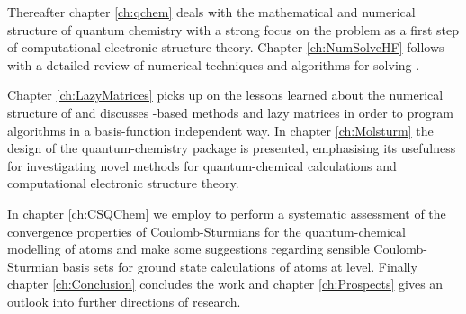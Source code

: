 Thereafter chapter \ref{ch:qchem}
deals with the mathematical and numerical structure of quantum chemistry
with a strong focus on the \HF problem
as a first step of computational electronic structure theory.
Chapter \ref{ch:NumSolveHF}
follows with a detailed review of numerical techniques and \SCF algorithms
for solving \HF.

Chapter \ref{ch:LazyMatrices}
picks up on the lessons learned about the numerical structure
of \HF and discusses
\contraction-based methods and lazy matrices
in order to program algorithms
in a basis-function independent way.
In chapter \ref{ch:Molsturm} the design of the quantum-chemistry
package \molsturm is presented,
emphasising its usefulness for investigating novel methods
for quantum-chemical calculations
and computational electronic structure theory.

In chapter \ref{ch:CSQChem} we employ \molsturm
to perform a systematic assessment of
the convergence properties of Coulomb-Sturmians
for the quantum-chemical modelling of atoms
and make some suggestions regarding
sensible Coulomb-Sturmian basis sets for ground state calculations of atoms
at \HF level.
Finally chapter \ref{ch:Conclusion} concludes the work and
chapter \ref{ch:Prospects} gives
an outlook into further directions of research.
